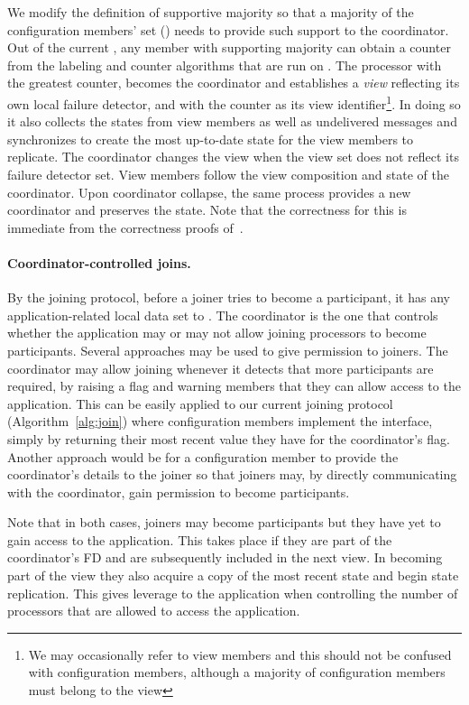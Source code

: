 \documentclass[11pt]{article}
\begin{document}
We modify the definition of supportive majority so that a majority of the configuration members' set () needs to provide such support to the coordinator.
Out of the current , any  member with supporting majority can obtain a counter from the labeling and counter algorithms that are run on . 
The processor with the greatest counter, becomes the coordinator and establishes a \emph{view} reflecting its own local failure detector, and with the counter as its view identifier{\footnote{We may occasionally refer to view members and this should not be confused with configuration members, although a majority of configuration members must belong to the view}}.
In doing so it also collects the states from view members as well as undelivered messages and synchronizes to create the most up-to-date state for the view members to replicate.
The coordinator changes the view when the view set does not reflect its failure detector set.
View members follow the view composition and state of the coordinator.
Upon coordinator collapse, the same process provides a new coordinator and preserves the state. Note that the correctness for this is immediate from the correctness proofs of~\cite{SSVS}.

\paragraph{Coordinator-controlled joins.}
By the joining protocol, before a joiner tries to become a participant, it has any application-related local data set to . The coordinator is the one that controls whether the application may or may not allow joining processors to become participants.
Several approaches may be used to give permission to joiners.
The coordinator may allow joining whenever it detects that more participants are required, by raising a flag and warning  members that they can allow access to the application. 
This can be easily applied to our current joining protocol (Algorithm~\ref{alg:join}) where configuration members implement the  interface, simply by returning their most recent  value they have for the coordinator's flag.
Another approach would be for a configuration member to provide the coordinator's details to the joiner so that joiners may, by directly communicating with the coordinator, gain permission to become participants.

Note that in both cases, joiners may become participants but they have yet to gain access to the application.
This takes place if they are part of the coordinator's FD and are subsequently included in the next view.
In becoming part of the view they also acquire a copy of the most recent state and begin state replication.
This gives leverage to the application when controlling the number of processors that are allowed to access the application. 
\end{document}
